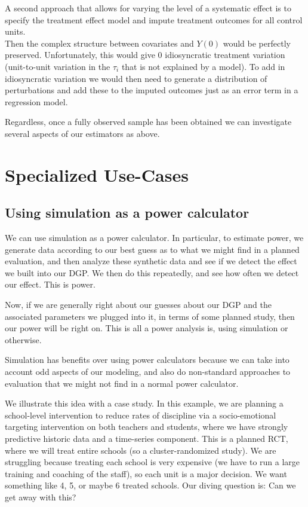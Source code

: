 \documentclass[
]{book}
\begin{document}
A second approach that allows for varying the level of a systematic effect is to specify the treatment effect model and impute treatment outcomes for all control units.\\
Then the complex structure between covariates and \(Y(0)\) would be perfectly preserved.
Unfortunately, this would give 0 idiosyncratic treatment variation (unit-to-unit variation in the \(\tau_i\) that is not explained by a model).
To add in idiosyncratic variation we would then need to generate a distribution of perturbations and add these to the imputed outcomes just as an error term in a regression model.

Regardless, once a fully observed sample has been obtained we can investigate several aspects of our estimators as above.

\part{Specialized Use-Cases}\label{part-specialized-use-cases}

\chapter{Using simulation as a power calculator}\label{using-simulation-as-a-power-calculator}

We can use simulation as a power calculator.
In particular, to estimate power, we generate data according to our best guess as to what we might find in a planned evaluation, and then analyze these synthetic data and see if we detect the effect we built into our DGP.
We then do this repeatedly, and see how often we detect our effect.
This is power.

Now, if we are generally right about our guesses about our DGP and the associated parameters we plugged into it, in terms of some planned study, then our power will be right on.
This is all a power analysis is, using simulation or otherwise.

Simulation has benefits over using power calculators because we can take into account odd aspects of our modeling, and also do non-standard approaches to evaluation that we might not find in a normal power calculator.

We illustrate this idea with a case study.
In this example, we are planning a school-level intervention to reduce rates of discipline via a socio-emotional targeting intervention on both teachers and students, where we have strongly predictive historic data and a time-series component.
This is a planned RCT, where we will treat entire schools (so a cluster-randomized study).
We are struggling because treating each school is very expensive (we have to run a large training and coaching of the staff), so each unit is a major decision.
We want something like 4, 5, or maybe 6 treated schools.
Our diving question is: Can we get away with this?
\end{document}
